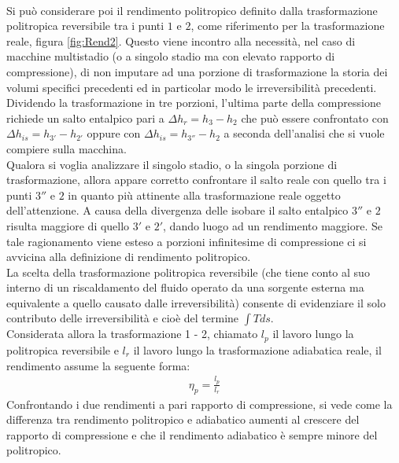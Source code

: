 \\Si può considerare poi il rendimento politropico definito dalla trasformazione politropica reversibile tra i punti $1$ e $2$, come riferimento per la trasformazione reale, figura \ref{fig:Rend2}. Questo viene incontro alla necessità, nel caso di macchine multistadio (o a singolo stadio ma con elevato rapporto di compressione), di non imputare ad una porzione di trasformazione la storia dei volumi specifici precedenti ed in particolar modo le irreversibilità precedenti.\\
Dividendo la trasformazione in tre porzioni, l'ultima parte della compressione richiede un salto entalpico pari a $\Delta h_r = h_3 - h_2$ che può essere confrontato con $\Delta h_{is} = h_{3'} - h_{2'}$ oppure con $\Delta h_{is} = h_{3''} - h_2$ a seconda dell'analisi che si vuole compiere sulla macchina.\\
Qualora si voglia analizzare il singolo stadio, o la singola porzione di trasformazione, allora appare corretto confrontare il salto reale con quello tra i punti $3''$ e $2$ in quanto più attinente alla trasformazione reale oggetto dell'attenzione. A causa della divergenza delle isobare il salto entalpico $3''$ e $2$ risulta maggiore di quello $3'$ e $2'$, dando luogo ad un rendimento maggiore. Se tale ragionamento viene esteso a porzioni infinitesime di compressione ci si avvicina alla definizione di rendimento politropico.\\
La scelta della trasformazione politropica reversibile (che tiene conto al suo interno di un riscaldamento del fluido operato da una sorgente esterna ma equivalente a quello causato dalle irreversibilità) consente di evidenziare il solo contributo delle irreversibilità e cioè del termine $\int Tds$.\\
Considerata allora la trasformazione 1 - 2, chiamato $l_p$ il lavoro lungo la politropica reversibile e $l_r$ il lavoro lungo la trasformazione adiabatica reale, il rendimento assume la seguente forma:
\begin{align*}
\eta_p = \frac{l_p}{l_r}
\end{align*}
Confrontando i due rendimenti a pari rapporto di compressione, si vede come la differenza tra rendimento politropico e adiabatico aumenti al crescere del rapporto di compressione e che il rendimento adiabatico è sempre minore del politropico.
